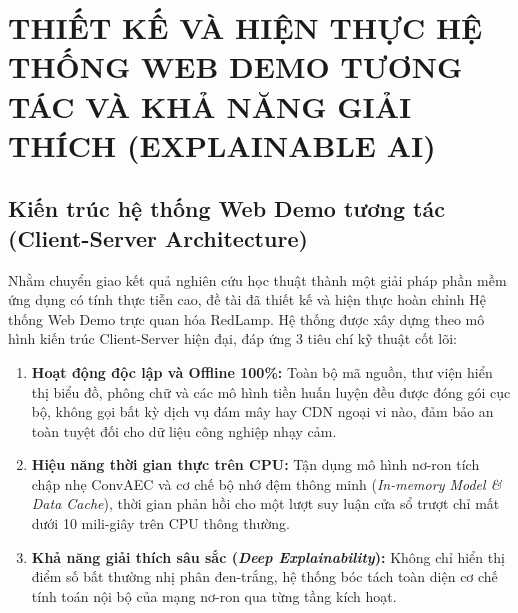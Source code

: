 \documentclass[11pt,journal,onecolumn]{IEEEtran}
\begin{document}



\section{THIẾT KẾ VÀ HIỆN THỰC HỆ THỐNG WEB DEMO TƯƠNG TÁC VÀ KHẢ NĂNG GIẢI THÍCH (EXPLAINABLE AI)}
\label{sec:chapter6}

\subsection{Kiến trúc hệ thống Web Demo tương tác (Client-Server Architecture)}
Nhằm chuyển giao kết quả nghiên cứu học thuật thành một giải pháp phần mềm ứng dụng có tính thực tiễn cao, đề tài đã thiết kế và hiện thực hoàn chỉnh Hệ thống Web Demo trực quan hóa RedLamp. Hệ thống được xây dựng theo mô hình kiến trúc Client-Server hiện đại, đáp ứng 3 tiêu chí kỹ thuật cốt lõi:
\begin{enumerate}
    \item \textbf{Hoạt động độc lập và Offline 100\%:} Toàn bộ mã nguồn, thư viện hiển thị biểu đồ, phông chữ và các mô hình tiền huấn luyện đều được đóng gói cục bộ, không gọi bất kỳ dịch vụ đám mây hay CDN ngoại vi nào, đảm bảo an toàn tuyệt đối cho dữ liệu công nghiệp nhạy cảm.
    \item \textbf{Hiệu năng thời gian thực trên CPU:} Tận dụng mô hình nơ-ron tích chập nhẹ ConvAEC và cơ chế bộ nhớ đệm thông minh (\textit{In-memory Model \& Data Cache}), thời gian phản hồi cho một lượt suy luận cửa sổ trượt chỉ mất dưới 10 mili-giây trên CPU thông thường.
    \item \textbf{Khả năng giải thích sâu sắc (\textit{Deep Explainability}):} Không chỉ hiển thị điểm số bất thường nhị phân đen-trắng, hệ thống bóc tách toàn diện cơ chế tính toán nội bộ của mạng nơ-ron qua từng tầng kích hoạt.
\end{enumerate}
\end{document}
